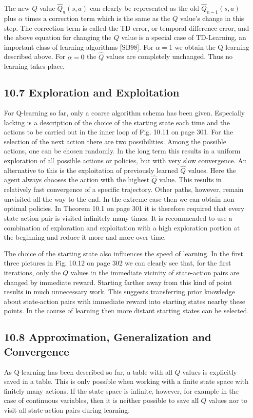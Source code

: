\documentclass[10pt]{article}
\begin{document}
The new $Q$ value $\hat{Q}_{n}(s, a)$ can clearly be represented as the old $\hat{Q}_{n-1}(s, a)$ plus $\alpha$ times a correction term which is the same as the $Q$ value's change in this step. The correction term is called the TD-error, or temporal difference error, and the above equation for changing the $Q$ value is a special case of TD-Learning, an important class of learning algorithms [SB98]. For $\alpha=1$ we obtain the Q-learning described above. For $\alpha=0$ the $\hat{Q}$ values are completely unchanged. Thus no learning takes place.

\subsection*{10.7 Exploration and Exploitation}
For Q-learning so far, only a coarse algorithm schema has been given. Especially lacking is a description of the choice of the starting state each time and the actions to be carried out in the inner loop of Fig. 10.11 on page 301. For the selection of the next action there are two possibilities. Among the possible actions, one can be chosen randomly. In the long term this results in a uniform exploration of all possible actions or policies, but with very slow convergence. An alternative to this is the exploitation of previously learned $\hat{Q}$ values. Here the agent always chooses the action with the highest $\hat{Q}$ value. This results in relatively fast convergence of a specific trajectory. Other paths, however, remain unvisited all the way to the end. In the extreme case then we can obtain non-optimal policies. In Theorem 10.1 on page 301 it is therefore required that every state-action pair is visited infinitely many times. It is recommended to use a combination of exploration and exploitation with a high exploration portion at the beginning and reduce it more and more over time.

The choice of the starting state also influences the speed of learning. In the first three pictures in Fig. 10.12 on page 302 we can clearly see that, for the first iterations, only the $Q$ values in the immediate vicinity of state-action pairs are changed by immediate reward. Starting farther away from this kind of point results in much unnecessary work. This suggests transferring prior knowledge about state-action pairs with immediate reward into starting states nearby these points. In the course of learning then more distant starting states can be selected.

\subsection*{10.8 Approximation, Generalization and Convergence}
As Q-learning has been described so far, a table with all $Q$ values is explicitly saved in a table. This is only possible when working with a finite state space with finitely many actions. If the state space is infinite, however, for example in the case of continuous variables, then it is neither possible to save all $Q$ values nor to visit all state-action pairs during learning.
\end{document}
